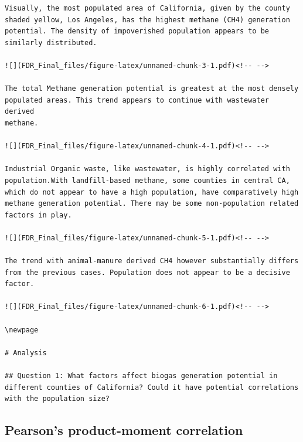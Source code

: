 \documentclass[
  12pt,
]{article}
\begin{document}
\begin{verbatim}
Visually, the most populated area of California, given by the county
shaded yellow, Los Angeles, has the highest methane (CH4) generation
potential. The density of impoverished population appears to be
similarly distributed.

![](FDR_Final_files/figure-latex/unnamed-chunk-3-1.pdf)<!-- --> 

The total Methane generation potential is greatest at the most densely
populated areas. This trend appears to continue with wastewater derived
methane.

![](FDR_Final_files/figure-latex/unnamed-chunk-4-1.pdf)<!-- --> 

Industrial Organic waste, like wastewater, is highly correlated with
population.With landfill-based methane, some counties in central CA,
which do not appear to have a high population, have comparatively high
methane generation potential. There may be some non-population related
factors in play.

![](FDR_Final_files/figure-latex/unnamed-chunk-5-1.pdf)<!-- --> 

The trend with animal-manure derived CH4 however substantially differs
from the previous cases. Population does not appear to be a decisive
factor.

![](FDR_Final_files/figure-latex/unnamed-chunk-6-1.pdf)<!-- --> 

\newpage

# Analysis

## Question 1: What factors affect biogas generation potential in different counties of California? Could it have potential correlations with the population size?

\end{verbatim}

\hypertarget{section}{%
\subsection{}\label{section}}

\hypertarget{pearsons-product-moment-correlation}{%
\subsection{Pearson's product-moment
correlation}\label{pearsons-product-moment-correlation}}

\hypertarget{section-1}{%
\subsection{}\label{section-1}}
\end{document}
